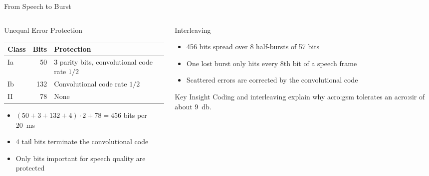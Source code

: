 \begin{frame}{From Speech to Burst}
  \centering
  

  \vspace{0.5em}
  \raggedright
  \begin{columns}[T,onlytextwidth]
    \begin{column}{0.54\textwidth}
      Unequal Error Protection~\cite{etsi.145.001.v18}

      \centering
      \footnotesize
      \begin{tabular}{lrl}
        \toprule
        \textbf{Class} & \textbf{Bits} & \textbf{Protection} \\
        \midrule
        Ia & 50 & 3 parity bits, convolutional code rate $1/2$ \\
        Ib & 132 & Convolutional code rate $1/2$ \\
        II & 78 & None \\
        \bottomrule
      \end{tabular}

      \normalsize
      \raggedright
      \begin{itemize}
        \item $(50 + 3 + 132 + 4) \cdot 2 + 78 = 456$ bits per \qty{20}{\milli\second}
        \item 4 tail bits terminate the convolutional code
        \item Only bits important for speech quality are protected
      \end{itemize}
    \end{column}
    \begin{column}{0.42\textwidth}
      \begin{block}{Interleaving}
        \begin{itemize}
          \item 456 bits spread over 8 half-bursts of 57 bits
          \item One lost burst only hits every 8th bit of a speech frame
          \item Scattered errors are corrected by the convolutional code
        \end{itemize}
      \end{block}
      \begin{alertblock}{Key Insight}
        Coding and interleaving explain why \gls{acro:gsm} tolerates an \gls{acro:sir} of about \qty{9}{\decibel}.
      \end{alertblock}
    \end{column}
  \end{columns}
\end{frame}

